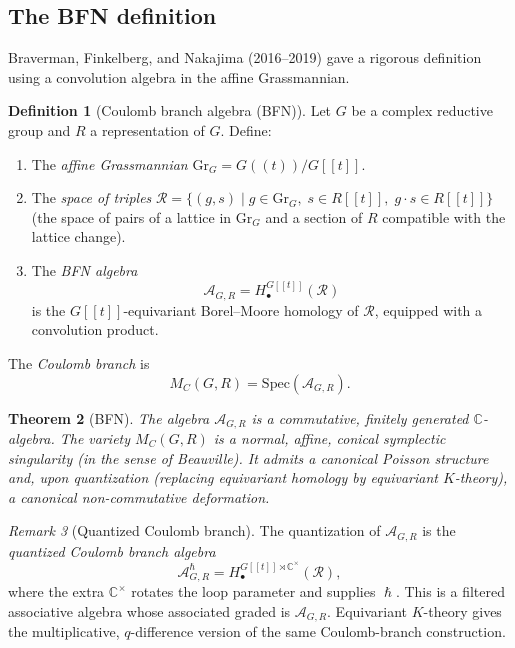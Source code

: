 \documentclass[11pt]{article}
\newtheorem{theorem}{Theorem}[section]
\theoremstyle{definition}
\newtheorem{definition}[theorem]{Definition}
\theoremstyle{remark}
\newtheorem{remark}[theorem]{Remark}
\newcommand{\Spec}{\mathrm{Spec}}
\renewcommand{\hbar}{\hslash}
\begin{document}
\subsection{The BFN definition}

Braverman, Finkelberg, and Nakajima (2016--2019) gave a rigorous definition using a convolution algebra in the affine Grassmannian.

\begin{definition}[Coulomb branch algebra (BFN)]
\label{def:bfn}
Let $G$ be a complex reductive group and $R$ a representation of $G$. Define:
\begin{enumerate}[label=(\roman*)]
 \item The \emph{affine Grassmannian} $\mathrm{Gr}_G = G(\!(t)\!) / G[\![t]\!]$.
 \item The \emph{space of triples} $\mathcal{R} = \{(g, s) \mid g \in \mathrm{Gr}_G,\; s \in R[\![t]\!],\; g \cdot s \in R[\![t]\!]\}$ (the space of pairs of a lattice in $\mathrm{Gr}_G$ and a section of $R$ compatible with the lattice change).
 \item The \emph{BFN algebra}
 \[
 \mathcal{A}_{G,R} = H^{G[\![t]\!]}_\bullet(\mathcal{R})
 \]
 is the $G[\![t]\!]$-equivariant Borel--Moore homology of $\mathcal{R}$, equipped with a convolution product.
\end{enumerate}
The \emph{Coulomb branch} is
\[
 M_C(G, R) = \Spec(\mathcal{A}_{G,R}).
\]
\end{definition}

\begin{theorem}[BFN]
\label{thm:bfn}
The algebra $\mathcal{A}_{G,R}$ is a commutative, finitely generated $\mathbb{C}$-algebra. The variety $M_C(G, R)$ is a normal, affine, conical symplectic singularity (in the sense of Beauville). It admits a canonical Poisson structure and, upon quantization (replacing equivariant homology by equivariant $K$-theory), a canonical non-commutative deformation.
\end{theorem}

\begin{remark}[Quantized Coulomb branch]
\label{rem:quantized-coulomb}
The quantization of $\mathcal{A}_{G,R}$ is the \emph{quantized Coulomb branch algebra}
\[
 \mathcal{A}_{G,R}^\hbar =
 H^{G[\![t]\!] \rtimes \mathbb{C}^\times}_\bullet(\mathcal{R}),
\]
where the extra $\mathbb{C}^\times$ rotates the loop parameter and supplies $\hbar$. This is a filtered associative algebra whose associated graded is $\mathcal{A}_{G,R}$. Equivariant $K$-theory gives the multiplicative, $q$-difference version of the same Coulomb-branch construction.
\end{remark}
\end{document}
